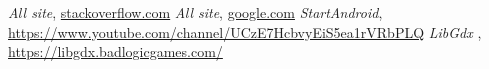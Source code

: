\begin{thebibliography}{99999}
\singlespace\normalsize

  \textit{ All site}, \url{stackoverflow.com}
  \textit{ All site}, \url{google.com}
  \textit{ StartAndroid}, \url{https://www.youtube.com/channel/UCzE7HcbvyEiS5ea1rVRbPLQ}
  \textit{ LibGdx }, \url{https://libgdx.badlogicgames.com/}



\end{thebibliography}
